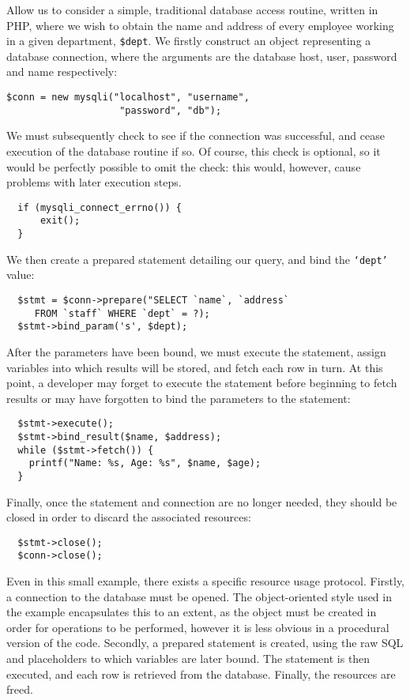 \documentclass[preprint]{sigplanconf}
\begin{document}
Allow us to consider a simple, traditional database access routine, written in PHP, where we wish to obtain the name and address of every employee working in a given department, \texttt{\$dept}. We firstly construct an object representing a database connection, where the arguments are the database host, user, password and name respectively:
%
\begin{Verbatim}
$conn = new mysqli("localhost", "username", 
                    "password", "db");
\end{Verbatim}
%
We must subsequently check to see if the connection was successful, and cease execution of the database routine if so. Of course, this check is optional, so it would be perfectly possible to omit the check: this would, however, cause problems with later execution steps.
%
\begin{Verbatim}
  if (mysqli_connect_errno()) {
      exit();
  }
\end{Verbatim}
%
We then create a prepared statement detailing our query, and bind the \texttt{`dept'} value:
\begin{Verbatim}
  $stmt = $conn->prepare("SELECT `name`, `address` 
     FROM `staff` WHERE `dept` = ?);
  $stmt->bind_param('s', $dept);
\end{Verbatim}
%
After the parameters have been bound, we must execute the statement, assign variables into which results will be stored, and fetch each row in turn. At this point, a developer may forget to execute the statement before beginning to fetch results or may have forgotten to bind the parameters to the statement:
%
\begin{Verbatim}
  $stmt->execute();
  $stmt->bind_result($name, $address);
  while ($stmt->fetch()) {
    printf("Name: %s, Age: %s", $name, $age);
  }
\end{Verbatim}
%
Finally, once the statement and connection are no longer needed, they should be closed in order to discard the associated resources:
%
\begin{Verbatim}
  $stmt->close();
  $conn->close();
\end{Verbatim}
%
Even in this small example, there exists a specific resource usage protocol. Firstly, a connection to the database must be opened. The object-oriented style used in the example encapsulates this to an extent, as the object must be created in order for operations to be performed, however it is less obvious in a procedural version of the code. Secondly, a prepared statement is created, using the raw SQL and placeholders to which variables are later bound. The statement is then executed, and each row is retrieved from the database. Finally, the resources are freed. 
\end{document}
